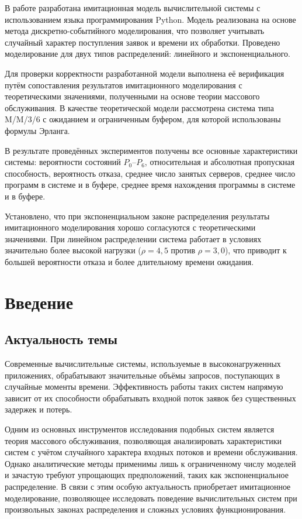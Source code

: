 \documentclass[14pt,a4paper]{extarticle}
\begin{document}
В работе разработана имитационная модель вычислительной системы с использованием
языка программирования Python. Модель реализована на основе метода
дискретно-событийного моделирования, что позволяет учитывать случайный характер
поступления заявок и времени их обработки. Проведено моделирование для двух типов
распределений: линейного и экспоненциального.

Для проверки корректности разработанной модели выполнена её верификация путём
сопоставления результатов имитационного моделирования с теоретическими значениями,
полученными на основе теории массового обслуживания. В качестве теоретической
модели рассмотрена система типа M/M/3/6 с ожиданием и ограниченным буфером, для
которой использованы формулы Эрланга.

В результате проведённых экспериментов получены все основные характеристики
системы: вероятности состояний $P_0$--$P_6$, относительная и абсолютная
пропускная способность, вероятность отказа, среднее число занятых серверов,
среднее число программ в системе и в буфере, среднее время нахождения программы
в системе и в буфере.

Установлено, что при экспоненциальном законе распределения результаты
имитационного моделирования хорошо согласуются с теоретическими значениями.
При линейном распределении система работает в условиях значительно более высокой
нагрузки ($\rho = 4{,}5$ против $\rho = 3{,}0$), что приводит к большей
вероятности отказа и более длительному времени ожидания.

\newpage
\tableofcontents

\newpage
\section{Введение}

\subsection{Актуальность темы}

Современные вычислительные системы, используемые в высоконагруженных
приложениях, обрабатывают значительные объёмы запросов, поступающих в случайные
моменты времени. Эффективность работы таких систем напрямую зависит от их
способности обрабатывать входной поток заявок без существенных задержек и потерь.

Одним из основных инструментов исследования подобных систем является теория
массового обслуживания, позволяющая анализировать характеристики систем с учётом
случайного характера входных потоков и времени обслуживания. Однако аналитические
методы применимы лишь к ограниченному числу моделей и зачастую требуют
упрощающих предположений, таких как экспоненциальное распределение. В связи с
этим особую актуальность приобретает имитационное моделирование, позволяющее
исследовать поведение вычислительных систем при произвольных законах
распределения и сложных условиях функционирования.
\end{document}
